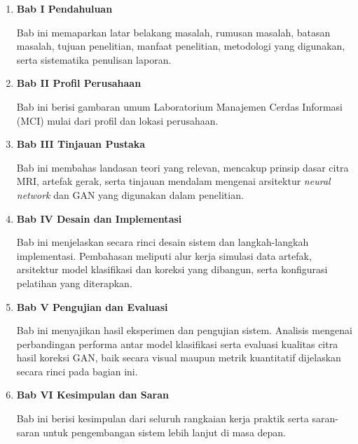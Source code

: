 \begin{enumerate}[nolistsep]

  \item \textbf{Bab I Pendahuluan}

  Bab ini memaparkan latar belakang masalah, rumusan masalah, batasan masalah, tujuan penelitian, manfaat penelitian, metodologi yang digunakan, serta sistematika penulisan laporan.

  \item \textbf{Bab II Profil Perusahaan}

  Bab ini berisi gambaran umum Laboratorium Manajemen Cerdas Informasi (MCI) mulai dari profil dan lokasi perusahaan.

  \item \textbf{Bab III Tinjauan Pustaka}

  Bab ini membahas landasan teori yang relevan, mencakup prinsip dasar citra MRI, artefak gerak, serta tinjauan mendalam mengenai arsitektur \textit{neural network} dan GAN yang digunakan dalam penelitian.

  \item \textbf{Bab IV Desain dan Implementasi}

  Bab ini menjelaskan secara rinci desain sistem dan langkah-langkah implementasi. Pembahasan meliputi alur kerja simulasi data artefak, arsitektur model klasifikasi dan koreksi yang dibangun, serta konfigurasi pelatihan yang diterapkan.

  \item \textbf{Bab V Pengujian dan Evaluasi}

  Bab ini menyajikan hasil eksperimen dan pengujian sistem. Analisis mengenai perbandingan performa antar model klasifikasi serta evaluasi kualitas citra hasil koreksi GAN, baik secara visual maupun metrik kuantitatif dijelaskan secara rinci pada bagian ini.

  \item \textbf{Bab VI Kesimpulan dan Saran}

  Bab ini berisi kesimpulan dari seluruh rangkaian kerja praktik serta saran-saran untuk pengembangan sistem lebih lanjut di masa depan.

\end{enumerate}
